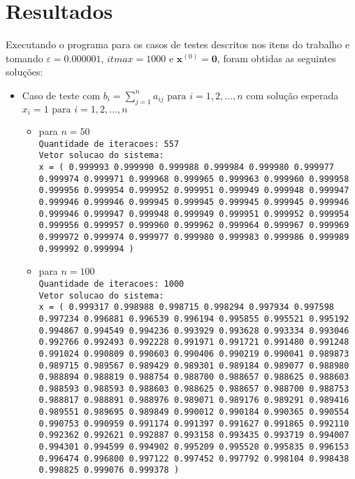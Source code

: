 \section{Resultados}
Executando o programa para os casos de testes descritos nos itens do trabalho e tomando $\varepsilon = 0.000001$, $itmax = 1000$ e $\mathbf{x}^{(0)} = \mathbf{0}$, foram obtidas as seguintes soluções:

\begin{itemize}
	\item Caso de teste com $b_{i} = \sum_{j=1}^{n}a_{ij} \text{ para } i = 1, 2, \dots, n$ com solução esperada $x_{i} = 1 \text{ para } i = 1, 2, \dots, n$

	\begin{itemize}
		\item para $n = 50$\\
		\texttt{Quantidade de iteracoes: 557\\
			Vetor solucao do sistema:\\
			x = (  0.999993  0.999990  0.999988  0.999984  0.999980  0.999977  0.999974  0.999971  0.999968  0.999965  0.999963  0.999960  0.999958  0.999956  0.999954  0.999952  0.999951  0.999949  0.999948  0.999947  0.999946  0.999946  0.999945  0.999945  0.999945  0.999945  0.999946  0.999946  0.999947  0.999948  0.999949  0.999951  0.999952  0.999954  0.999956  0.999957  0.999960  0.999962  0.999964  0.999967  0.999969  0.999972  0.999974  0.999977  0.999980  0.999983  0.999986  0.999989  0.999992  0.999994  )}
		\item para $n = 100$\\
		\texttt{Quantidade de iteracoes: 1000\\
			Vetor solucao do sistema:\\
			x = (  0.999317  0.998988  0.998715  0.998294  0.997934  0.997598  0.997234  0.996881  0.996539  0.996194  0.995855  0.995521  0.995192  0.994867  0.994549  0.994236  0.993929  0.993628  0.993334  0.993046  0.992766  0.992493  0.992228  0.991971  0.991721  0.991480  0.991248  0.991024  0.990809  0.990603  0.990406  0.990219  0.990041  0.989873  0.989715  0.989567  0.989429  0.989301  0.989184  0.989077  0.988980  0.988894  0.988819  0.988754  0.988700  0.988657  0.988625  0.988603  0.988593  0.988593  0.988603  0.988625  0.988657  0.988700  0.988753  0.988817  0.988891  0.988976  0.989071  0.989176  0.989291  0.989416  0.989551  0.989695  0.989849  0.990012  0.990184  0.990365  0.990554  0.990753  0.990959  0.991174  0.991397  0.991627  0.991865  0.992110  0.992362  0.992621  0.992887  0.993158  0.993435  0.993719  0.994007  0.994301  0.994599  0.994902  0.995209  0.995520  0.995835  0.996153  0.996474  0.996800  0.997122  0.997452  0.997792  0.998104  0.998438  0.998825  0.999076  0.999378  )}
	\end{itemize}


\end{itemize}
